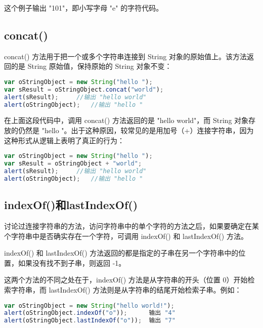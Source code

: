 这个例子输出 "101"，即小写字母 "e" 的字符代码。



\subsection{concat()}



concat() 方法用于把一个或多个字符串连接到 String 对象的原始值上。该方法返回的是 String 原始值，保持原始的 String 对象不变：


\begin{lstlisting}[language=JavaScript]
var oStringObject = new String("hello ");
var sResult = oStringObject.concat("world");
alert(sResult);		//输出 "hello world"
alert(oStringObject);	//输出 "hello "
\end{lstlisting}

在上面这段代码中，调用 concat() 方法返回的是 "hello world"，而 String 对象存放的仍然是 "hello "。出于这种原因，较常见的是用加号（+）连接字符串，因为这种形式从逻辑上表明了真正的行为：


\begin{lstlisting}[language=JavaScript]
var oStringObject = new String("hello ");
var sResult = oStringObject + "world";
alert(sResult);		//输出 "hello world"
alert(oStringObject);	//输出 "hello "
\end{lstlisting}



\subsection{indexOf()和lastIndexOf()}



讨论过连接字符串的方法，访问字符串中的单个字符的方法之后，如果要确定在某个字符串中是否确实存在一个字符，可调用 indexOf() 和 lastIndexOf() 方法。

indexOf() 和 lastIndexOf() 方法返回的都是指定的子串在另一个字符串中的位置，如果没有找不到子串，则返回 -1。

这两个方法的不同之处在于，indexOf() 方法是从字符串的开头（位置 0）开始检索字符串，而 lastIndexOf() 方法则是从字符串的结尾开始检索子串。例如：


\begin{lstlisting}[language=JavaScript]
var oStringObject = new String("hello world!");
alert(oStringObject.indexOf("o"));		输出 "4"
alert(oStringObject.lastIndexOf("o"));	输出 "7"
\end{lstlisting}


